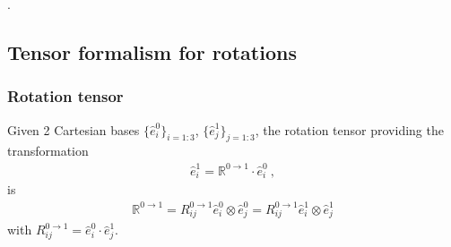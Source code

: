 \documentclass[letterpaper,10pt,english]{jupyterBook}
\begin{document}
\sphinxAtStartPar
{\hyperref[\detokenize{ch/kinematics-rotations-param-quaternions:classical-mechanics-kinematics-rotations-quaternions}]{}}.

\sphinxstepscope


\subsection{Tensor formalism for rotations}
\label{\detokenize{ch/kinematics-rotations-tensors:tensor-formalism-for-rotations}}\label{\detokenize{ch/kinematics-rotations-tensors:classical-mechanics-kinematics-rotations-tensor}}\label{\detokenize{ch/kinematics-rotations-tensors::doc}}

\subsubsection{Rotation tensor}
\label{\detokenize{ch/kinematics-rotations-tensors:rotation-tensor}}
\sphinxAtStartPar
Given 2 Cartesian bases \(\{ \hat{e}^0_i \}_{i=1:3}\), \(\{ \hat{e}^1_j \}_{j=1:3}\), the rotation tensor providing the transformation
\begin{equation*}
\begin{split}\hat{e}^1_i = \mathbb{R}^{0 \rightarrow 1} \cdot \hat{e}^0_i \ ,\end{split}
\end{equation*}
\sphinxAtStartPar
is
\begin{equation*}
\begin{split}\mathbb{R}^{0 \rightarrow 1}
 = R_{ij}^{0 \rightarrow 1} \hat{e}^0_i \otimes \hat{e}^0_j  
 = R_{ij}^{0 \rightarrow 1} \hat{e}^1_i \otimes \hat{e}^1_j 
\end{split}
\end{equation*}
\sphinxAtStartPar
with \(R^{0 \rightarrow 1}_{ij} = \hat{e}^0_i \cdot \hat{e}^1_j\).
\end{document}

